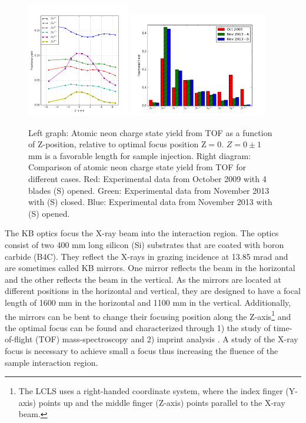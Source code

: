 \begin{figure}
	\centering
		\includegraphics[width=0.40\textwidth]{images/Focus-z-scan.png}
		\includegraphics[width=0.54\textwidth]{images/Focus-Fractional-Yield.png}
	\caption[Focal spot analysis using a time-of-flight ion spectrometer.]{Left graph: Atomic neon charge state yield from TOF as a function of Z-position, relative to optimal focus position $\text{Z}=0$. $Z=0\pm1$ mm is a favorable length for sample injection. Right diagram: Comparison of atomic neon charge state yield from TOF for different cases. Red: Experimental data from October 2009 with 4 blades (S) opened. Green: Experimental data from November 2013 with (S) closed. Blue: Experimental data from November 2013 with (S) opened.}
	\label{fig:Focus-z-scan}
\end{figure}
The KB optics focus the X-ray beam into the interaction region. The optics consist of two 400 mm long silicon (Si) substrates that are coated with boron carbide (B4C). They reflect the X-rays in grazing incidence at 13.85 mrad and are sometimes called KB mirrors. One mirror reflects the beam in the horizontal and the other reflects the beam in the vertical. As the mirrors are located at different positions in the horizontal and vertical, they are designed to have a focal length of 1600 mm in the horizontal and 1100 mm in the vertical. Additionally, the mirrors can be bent to change their focusing position along the Z-axis\footnote{The LCLS uses a right-handed coordinate system, where the index finger (Y-axis) points up and the middle finger (Z-axis) points parallel to the X-ray beam.} and the optimal focus can be found and characterized through 1) the study of time-of-flight (TOF) mass-spectroscopy \citep{Bucher-2016-Unpublished} and 2) imprint analysis \citep{Hajkova-2011-SPIE,Chalupsky-2011-NIMPR}. A study of the X-ray focus is necessary to achieve small a focus thus increasing the fluence of the sample interaction region.
